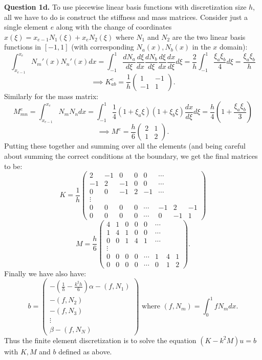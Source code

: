 \documentclass[letterpaper, reqno,11pt]{article}
\begin{document}
{\medskip\noindent\bf Question 1d.} To use piecewise linear basis functions with discretization size $h$, all we have to do is construct the stiffness and mass matrices. Consider just a single element $e$ along with the change of coordinates $x(\xi)=x_{e-1}N_1(\xi)+x_eN_2(\xi)$ where $N_1$ and $N_2$ are the two linear basis functions in $[-1,1]$ (with corresponding $N_a(x),N_b(x)$ in the $x$ domain):
\[
    \int_{x_{e-1}}^{x_e}N_m'(x)N_n'(x)dx=\int_{-1}^{1}\frac{dN_a}{d\xi}\frac{d\xi}{dx}\frac{dN_b}{d\xi}\frac{d\xi}{dx}\frac{dx}{d\xi}d\xi=\frac{2}{h}\int_{-1}^{1}\frac{\xi_a\xi_b}{4}d\xi=\frac{\xi_a\xi_b}{h}
\]
\[
    \implies K_{ab}^{e}=\frac{1}{h} \begin{pmatrix} 1&-1\\-1&1 \end{pmatrix} 
.\]
Similarly for the mass matrix:
\[
M_{mn}^{e}=\int_{x_{e-1}}^{x_e}N_mN_ndx=\int_{-1}^{1}\frac{1}{4}\left( 1+\xi_a\xi \right)\left( 1+\xi_b\xi \right) \frac{dx}{d\xi}d\xi=\frac{h}{4}\left( 1+\frac{\xi_a\xi_b}{3} \right) 
\]
\[
    \implies M^{e}=\frac{h}{6}\begin{pmatrix} 2&1\\1&2 \end{pmatrix} 
.\]
Putting these together and summing over all the elements (and being careful about summing the correct conditions at the boundary, we get the final matrices to be:
\[
    K=\frac{1}{h}\begin{pmatrix} 2&-1&0&0&0&\cdots\\-1&2&-1&0&0&\cdots\\ 0&0&-1&2&-1&\cdots\\ \vdots\\ 0&0&0&0&\cdots&-1&2&-1\\ 0&0&0&0&\cdots&0&-1&1\end{pmatrix} 
\]
\[
    M=\frac{h}{6}\begin{pmatrix} 4&1&0&0&0&\cdots\\1&4&1&0&0&\cdots\\ 0&0&1&4&1&\cdots\\ \vdots\\ 0&0&0&0&\cdots&1&4&1\\ 0&0&0&0&\cdots&0&1&2\end{pmatrix} 
.\]
Finally we have also have:
\[
b = \begin{pmatrix} -\left(\frac{1}{h}-\frac{k^2h}{6}\right)\alpha-(f,N_1)\\-(f,N_2)\\-(f,N_3)\\\vdots \\\beta-(f,N_N) \end{pmatrix} \text{ where } (f,N_m)=\int_{0}^{1}fN_mdx
.\]
Thus the finite element discretization is to solve the equation $(K-k^2M)u=b$ with $K,M$ and $b$ defined as above.
\end{document}
